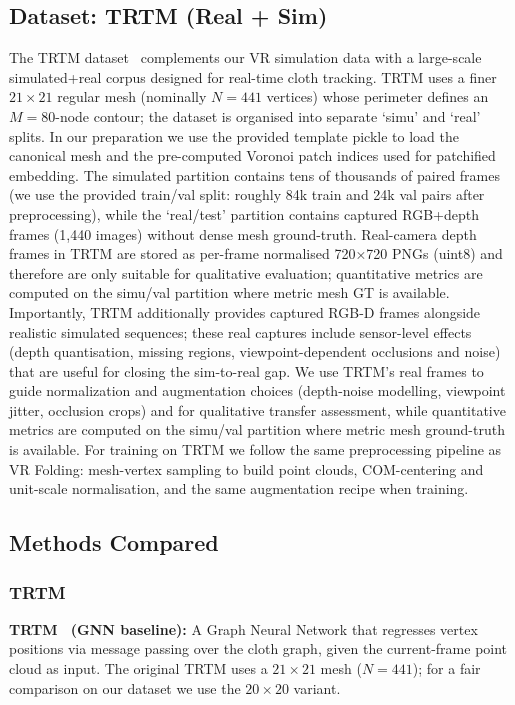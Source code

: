 \documentclass{article}
\begin{document}
\subsection{Dataset: TRTM (Real + Sim)}

The TRTM dataset~\cite{trtm} complements our VR simulation data with a large-scale simulated+real corpus designed for real-time cloth tracking. TRTM uses a finer $21\!\times\!21$ regular mesh (nominally $N=441$ vertices) whose perimeter defines an $M=80$-node contour; the dataset is organised into separate `simu' and `real' splits. In our preparation we use the provided template pickle to load the canonical mesh and the pre-computed Voronoi patch indices used for patchified embedding. The simulated partition contains tens of thousands of paired frames (we use the provided train/val split: roughly 84k train and 24k val pairs after preprocessing), while the `real/test' partition contains captured RGB+depth frames (1,440 images) without dense mesh ground-truth. Real-camera depth frames in TRTM are stored as per-frame normalised 720×720 PNGs (uint8) and therefore are only suitable for qualitative evaluation; quantitative metrics are computed on the simu/val partition where metric mesh GT is available. Importantly, TRTM additionally provides captured RGB-D frames alongside realistic simulated sequences; these real captures include sensor-level effects (depth quantisation, missing regions, viewpoint-dependent occlusions and noise) that are useful for closing the sim-to-real gap. We use TRTM's real frames to guide normalization and augmentation choices (depth-noise modelling, viewpoint jitter, occlusion crops) and for qualitative transfer assessment, while quantitative metrics are computed on the simu/val partition where metric mesh ground-truth is available. For training on TRTM we follow the same preprocessing pipeline as VR Folding: mesh-vertex sampling to build point clouds, COM-centering and unit-scale normalisation, and the same augmentation recipe when training.

\subsection{Methods Compared}

\subsubsection{TRTM}

\textbf{TRTM~\cite{trtm} (GNN baseline):} A Graph Neural Network that regresses vertex positions via message passing over the cloth graph, given the current-frame point cloud as input. The original TRTM uses a $21\!\times\!21$ mesh ($N=441$); for a fair comparison on our dataset we use the $20\!\times\!20$ variant.
\end{document}
